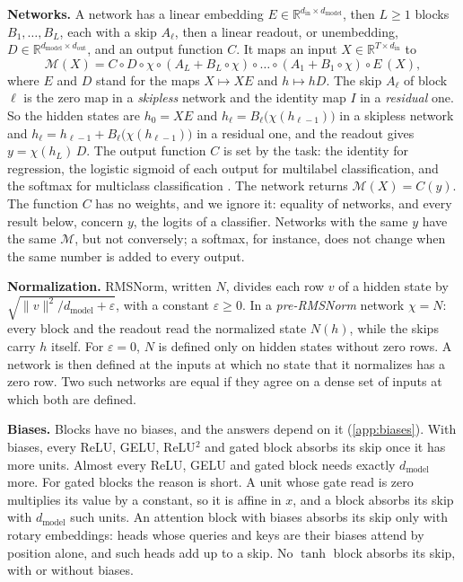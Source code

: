 \documentclass[10pt]{article}
\theoremstyle{definition}
\theoremstyle{remark}
\newcommand{\R}{\mathbb{R}}
\newcommand{\dm}{d_{\mathrm{model}}}
\newcommand{\norm}[1]{\lVert #1\rVert}
\newcommand{\para}[1]{\smallskip\noindent\textbf{#1}\hspace{0.5em}}
\begin{document}
\para{Networks.} A network has a linear embedding $E \in \R^{d_{\mathrm{in}}\times\dm}$, then $L \ge 1$ blocks $B_1, \dots, B_L$, each with a skip $A_\ell$, then a linear readout, or unembedding, $D \in \R^{\dm\times d_{\mathrm{out}}}$, and an output function $C$. It maps an input $X \in \R^{T\times d_{\mathrm{in}}}$ to
\[
\mathcal M(X) = C \circ D \circ \chi \circ (A_L + B_L \circ \chi) \circ \dots \circ (A_1 + B_1 \circ \chi) \circ E\,(X),
\]
where $E$ and $D$ stand for the maps $X \mapsto XE$ and $h \mapsto hD$. The skip $A_\ell$ of block $\ell$ is the zero map in a \emph{skipless} network and the identity map $I$ in a \emph{residual} one. So the hidden states are $h_0 = XE$ and $h_\ell = B_\ell\big(\chi(h_{\ell-1})\big)$ in a skipless network and $h_\ell = h_{\ell-1} + B_\ell\big(\chi(h_{\ell-1})\big)$ in a residual one, and the readout gives $y = \chi(h_L)\,D$. The output function $C$ is set by the task: the identity for regression, the logistic sigmoid of each output for multilabel classification, and the softmax for multiclass classification \citep[Sections~5.1 and~5.2]{bishop2006pattern}. The network returns $\mathcal M(X) = C(y)$. The function $C$ has no weights, and we ignore it: equality of networks, and every result below, concern $y$, the logits of a classifier. Networks with the same $y$ have the same $\mathcal M$, but not conversely; a softmax, for instance, does not change when the same number is added to every output.

\para{Normalization.} RMSNorm, written $N$, divides each row $v$ of a hidden state by $\sqrt{\norm{v}^2/\dm + \varepsilon}$, with a constant $\varepsilon \ge 0$. In a \emph{pre-RMSNorm} network $\chi = N$: every block and the readout read the normalized state $N(h)$, while the skips carry $h$ itself. For $\varepsilon = 0$, $N$ is defined only on hidden states without zero rows. A network is then defined at the inputs at which no state that it normalizes has a zero row. Two such networks are equal if they agree on a dense set of inputs at which both are defined.

\para{Biases.} Blocks have no biases, and the answers depend on it (\cref{app:biases}). With biases, every ReLU, GELU, ReLU$^2$ and gated block absorbs its skip once it has more units. Almost every ReLU, GELU and gated block needs exactly $\dm$ more. For gated blocks the reason is short. A unit whose gate read is zero multiplies its value by a constant, so it is affine in $x$, and a block absorbs its skip with $\dm$ such units. An attention block with biases absorbs its skip only with rotary embeddings: heads whose queries and keys are their biases attend by position alone, and such heads add up to a skip. No $\tanh$ block absorbs its skip, with or without biases.
\end{document}
